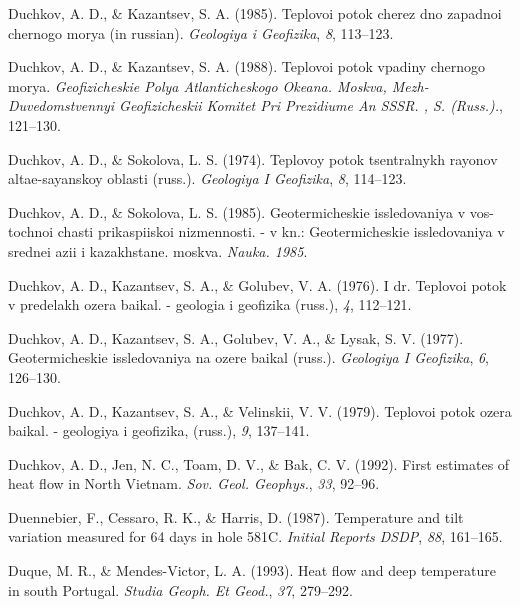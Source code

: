 \documentclass[draft,linenumbers]{agujournal2018}
\begin{document}
\leavevmode{}%
Duchkov, A. D., \& Kazantsev, S. A. (1985). Teplovoi potok cherez dno
zapadnoi chernogo morya (in russian). \emph{Geologiya i Geofizika},
\emph{8}, 113--123.

\leavevmode{}%
Duchkov, A. D., \& Kazantsev, S. A. (1988). Teplovoi potok vpadiny
chernogo morya. \emph{Geofizicheskie Polya Atlanticheskogo Okeana.
Moskva, Mezh- Duvedomstvennyi Geofizicheskii Komitet Pri Prezidiume An
SSSR. , S. (Russ.).}, 121--130.

\leavevmode{}%
Duchkov, A. D., \& Sokolova, L. S. (1974). Teplovoy potok tsentralnykh
rayonov altae-sayanskoy oblasti (russ.). \emph{Geologiya I Geofizika},
\emph{8}, 114--123.

\leavevmode{}%
Duchkov, A. D., \& Sokolova, L. S. (1985). Geotermicheskie issledovaniya
v vos- tochnoi chasti prikaspiiskoi nizmennosti. - v kn.:
Geotermicheskie issledovaniya v srednei azii i kazakhstane. moskva.
\emph{Nauka. 1985}.

\leavevmode{}%
Duchkov, A. D., Kazantsev, S. A., \& Golubev, V. A. (1976). I dr.
Teplovoi potok v predelakh ozera baikal. - geologia i geofizika (russ.),
\emph{4}, 112--121.

\leavevmode{}%
Duchkov, A. D., Kazantsev, S. A., Golubev, V. A., \& Lysak, S. V.
(1977). Geotermicheskie issledovaniya na ozere baikal (russ.).
\emph{Geologiya I Geofizika}, \emph{6}, 126--130.

\leavevmode{}%
Duchkov, A. D., Kazantsev, S. A., \& Velinskii, V. V. (1979). Teplovoi
potok ozera baikal. - geologiya i geofizika, (russ.), \emph{9},
137--141.

\leavevmode{}%
Duchkov, A. D., Jen, N. C., Toam, D. V., \& Bak, C. V. (1992). First
estimates of heat flow in {North Vietnam}. \emph{Sov. Geol. Geophys.},
\emph{33}, 92--96.

\leavevmode{}%
Duennebier, F., Cessaro, R. K., \& Harris, D. (1987). Temperature and
tilt variation measured for 64 days in hole 581C. \emph{Initial Reports
DSDP}, \emph{88}, 161--165.

\leavevmode{}%
Duque, M. R., \& Mendes-Victor, L. A. (1993). Heat flow and deep
temperature in south {Portugal}. \emph{Studia Geoph. Et Geod.},
\emph{37}, 279--292.
\end{document}
